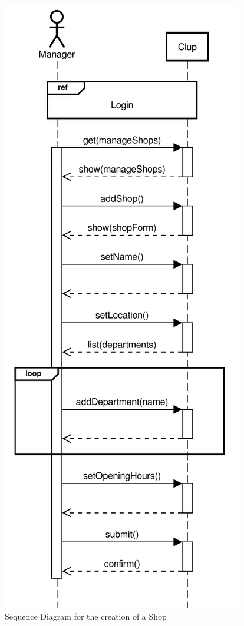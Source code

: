 \begin{figure}[H]
    \centering
    \includegraphics[scale=0.9]{Images/Sequence/add-shop_sequence_straight.pdf}
    \caption{Sequence Diagram for the creation of a Shop}
\end{figure}
